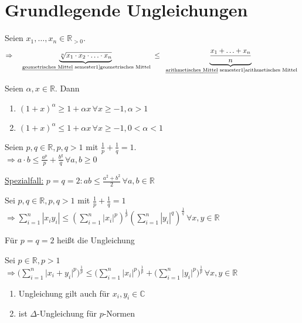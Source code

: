 \section{Grundlegende Ungleichungen}
\begin{proposition}
	Seien $x_1, \dotsc, x_n\in\mathbb{R}_{>0}$.
	\[\Rightarrow \;\;\underbrace{\sqrt[n]{x_1\cdot x_2\cdot \dotsc \cdot x_n}}_{\text{\begriff{geometrisches Mittel}}} \le \underbrace{\frac{x_1 + \dotsc + x_n}{n}}_{\text{\begriff{arithmetisches Mittel}}}\]
\end{proposition}
\begin{proposition}
	Seien $\alpha,x\in\mathbb{R}$. Dann
	\begin{enumerate}[label={\arabic*)}]
		\item $(1+x)^\alpha \ge 1 + \alpha x\,\forall x\ge -1, \alpha > 1$
		\item $(1+x)^\alpha \le 1+\alpha x \,\forall x\ge -1, 0 < \alpha < 1$
	\end{enumerate}
\end{proposition}
\begin{proposition}
	Seien $p,q\in\mathbb{R}, p,q > 1$ mit $\frac{1}{p}+\frac{1}{q}=1$.\\
	$\Rightarrow a\cdot b \le \frac{a^p}{p} + \frac{b^q}{q}\,\forall a,b\ge 0$
	
	\uline{Spezialfall:} $p=q=2: ab \le \frac{a^2+b^2}{2} \,\forall a,b\in \mathbb{R}$
\end{proposition}
\begin{proposition}
	Sei $p,q\in\mathbb{R}, p,q > 1$ mit $\frac{1}{p} + \frac{1}{q} = 1$\\
	$\Rightarrow \sum_{i=1}^{n} |x_i y_i| \le \left(\sum_{i=1}^n |x_i|^p \right)^{\frac{1}{p}}\left(\sum_{i=1}^n |y_i|^q\right)^{\frac{1}{q}}\,\forall x,y\in\mathbb{R}$
	
	Für $p=q=2$ heißt die Ungleichung 
\end{proposition}
\begin{proposition}
	Sei $p\in\mathbb{R}, p>1$\\
    $\Rightarrow \big(\sum_{i=1}^{n} \vert x_i + y_i \vert^p \big)^\frac{1}{p} \leq \big(\sum_{i=1}^{n} \vert x_i \vert^p \big)^\frac{1}{p} + \big(\sum_{i=1}^{n} \vert y_i \vert^p \big)^\frac{1}{p}\,\forall x,y\in \mathbb{R}$
\end{proposition}

\begin{remark}
	\begin{enumerate}[label={\arabic*)}]
    \item Ungleichung gilt auch für $x_i, y_i \in \mathbb{C}$
    \item ist $\Delta$-Ungleichung für $p$-Normen
    \end{enumerate}
\end{remark}